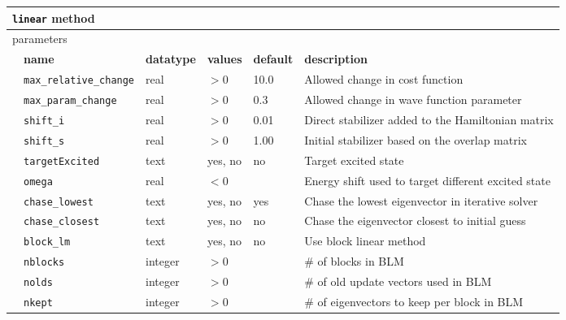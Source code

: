 \begin{table}[h]
\begin{center}
\begin{tabularx}{\textwidth}{l l l l l l }
\hline
\multicolumn{6}{l}{\texttt{linear} method} \\
\hline
\multicolumn{2}{l}{parameters}  & \multicolumn{4}{l}{}\\
   &   \bfseries name     & \bfseries datatype & \bfseries values & \bfseries default   & \bfseries description \\
   &   \texttt{max\_relative\_change} &  real     & $>0$ & 10.0 & Allowed change in cost function\\
   &   \texttt{max\_param\_change} &  real     & $>0$ & 0.3 & Allowed change in wave function parameter\\
   &   \texttt{shift\_i} &  real     & $>0$ & 0.01 & Direct stabilizer added to the Hamiltonian matrix\\
   &   \texttt{shift\_s} &  real     & $>0$ & 1.00 & Initial stabilizer based on the overlap matrix\\
   &   \texttt{targetExcited} &  text   & yes, no & no & Target excited state\\
   &   \texttt{omega} &  real   & $<0$ & & Energy shift used to target different excited state\\
   &   \texttt{chase\_lowest} &  text   & yes, no & yes & Chase the lowest eigenvector in iterative solver\\
   &   \texttt{chase\_closest} &  text   & yes, no & no & Chase the eigenvector closest to initial guess\\
   &   \texttt{block\_lm} &  text   & yes, no & no & Use block linear method\\
   &   \texttt{nblocks} &  integer   & $>0$ &  & \# of blocks in BLM\\
   &   \texttt{nolds} &  integer   & $>0$ &  & \# of old update vectors used in BLM\\
   &   \texttt{nkept} &  integer   & $>0$ &  & \# of eigenvectors to keep per block in BLM\\
  \hline
\end{tabularx}
\end{center}
\end{table}

